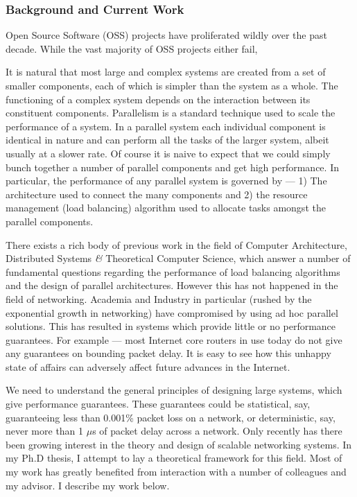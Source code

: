 \documentclass[10pt]{article}
\begin{document}
\begin{small}
\subsubsection*{Background and Current Work}

Open Source Software (OSS) projects have proliferated wildly over the past decade.
While the vast majority of OSS projects either fail, 



It is natural that most large and complex systems are created from a set 
of smaller components, each of which is simpler than the system as a whole. 
The functioning of a complex system depends on the interaction between its 
constituent components. Parallelism is a standard technique used to scale the
performance of a system. In a parallel system each individual component is 
identical in nature and can perform all the tasks of the larger system, 
albeit usually at a slower rate. Of course it is naive to expect that
we could simply bunch together a number of parallel components and get high performance.
In particular, the performance of any parallel system is governed by --- 1) The
architecture used to connect the many components and 2) the 
resource management (load balancing) algorithm used to 
allocate tasks amongst the parallel components. 

There exists a rich body of previous work in the field of Computer Architecture, 
Distributed Systems {\it \&}  Theoretical Computer Science, which answer a number of 
fundamental questions regarding the performance of load balancing algorithms and 
the design of parallel architectures.
However this has not happened in the field of networking. 
Academia and Industry in particular (rushed by the exponential growth in networking) 
have compromised by using ad hoc parallel solutions. This has resulted in systems
which provide little or no performance guarantees.
For example --- most Internet core routers in use today do not give any 
guarantees on bounding packet delay.
It is easy to see how this unhappy state of affairs can adversely affect 
future advances in the Internet.

We need to understand the general principles of designing large systems,
which give performance guarantees. These guarantees could be statistical, say, guaranteeing less
than 0.001\% packet loss on a network, or deterministic, say, never more than 1 $\mu$s of packet
delay across a network. Only recently has there been growing interest in the 
theory and design of scalable networking systems.
In my Ph.D thesis, I attempt to lay a theoretical framework for this field.
Most of my work has greatly benefited from interaction with a number of colleagues and my advisor.
I describe my work below.


\end{small}
\end{document}
